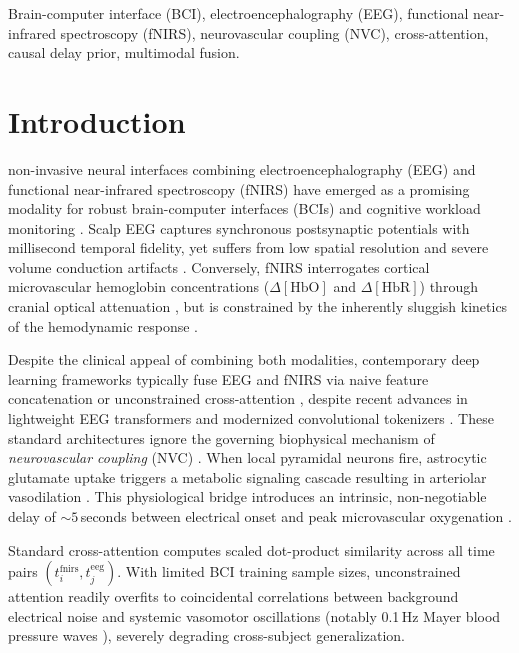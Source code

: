 \documentclass[journal]{IEEEtran}
\begin{document}
\begin{IEEEkeywords}
Brain-computer interface (BCI), electroencephalography (EEG), functional near-infrared spectroscopy (fNIRS), neurovascular coupling (NVC), cross-attention, causal delay prior, multimodal fusion.
\end{IEEEkeywords}

\section{Introduction}
 non-invasive neural interfaces combining electroencephalography (EEG) and functional near-infrared spectroscopy (fNIRS) have emerged as a promising modality for robust brain-computer interfaces (BCIs) and cognitive workload monitoring \cite{shin2017open, shin2018simultaneous}. Scalp EEG captures synchronous postsynaptic potentials with millisecond temporal fidelity, yet suffers from low spatial resolution and severe volume conduction artifacts \cite{buzsaki2012origin}. Conversely, fNIRS interrogates cortical microvascular hemoglobin concentrations ($\Delta[\text{HbO}]$ and $\Delta[\text{HbR}]$) through cranial optical attenuation \cite{delpy1988estimation}, but is constrained by the inherently sluggish kinetics of the hemodynamic response \cite{buxton1998dynamics, strangman2002non}.

Despite the clinical appeal of combining both modalities, contemporary deep learning frameworks typically fuse EEG and fNIRS via naive feature concatenation \cite{fazli2012enhanced, buccino2016hybrid, aydin2020subject} or unconstrained cross-attention \cite{vaswani2017attention}, despite recent advances in lightweight EEG transformers and modernized convolutional tokenizers \cite{salim2023lightweight, acharya2025eegconvnext}. These standard architectures ignore the governing biophysical mechanism of \textit{neurovascular coupling} (NVC) \cite{buxton1998dynamics, attwell2010glial, iadecola2004neurovascular}. When local pyramidal neurons fire, astrocytic glutamate uptake triggers a metabolic signaling cascade resulting in arteriolar vasodilation \cite{attwell2010glial}. This physiological bridge introduces an intrinsic, non-negotiable delay of $\sim 5$\,seconds between electrical onset and peak microvascular oxygenation \cite{buxton1998dynamics, friston1998event, glover1999deconvolution, pinti2019present}. 

Standard cross-attention computes scaled dot-product similarity across all time pairs $(t_i^{\text{fnirs}}, t_j^{\text{eeg}})$. With limited BCI training sample sizes, unconstrained attention readily overfits to coincidental correlations between background electrical noise and systemic vasomotor oscillations (notably 0.1\,Hz Mayer blood pressure waves \cite{julien2006enigma}), severely degrading cross-subject generalization.
\end{document}
